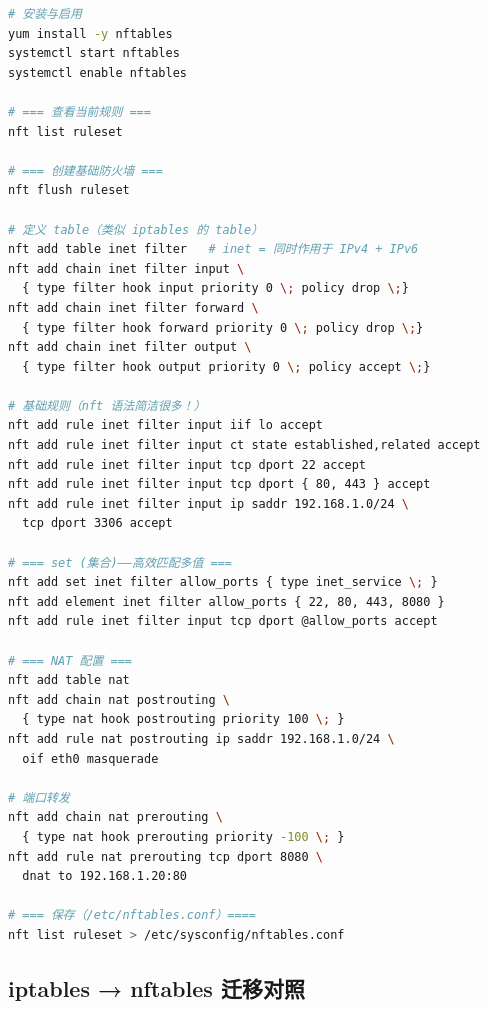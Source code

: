 \documentclass[12pt,UTF8]{ctexbook}
\begin{document}
\begin{lstlisting}[language=bash]
# 安装与启用
yum install -y nftables
systemctl start nftables
systemctl enable nftables

# === 查看当前规则 ===
nft list ruleset

# === 创建基础防火墙 ===
nft flush ruleset

# 定义 table（类似 iptables 的 table）
nft add table inet filter   # inet = 同时作用于 IPv4 + IPv6
nft add chain inet filter input \
  { type filter hook input priority 0 \; policy drop \;}
nft add chain inet filter forward \
  { type filter hook forward priority 0 \; policy drop \;}
nft add chain inet filter output \
  { type filter hook output priority 0 \; policy accept \;}

# 基础规则（nft 语法简洁很多！）
nft add rule inet filter input iif lo accept
nft add rule inet filter input ct state established,related accept
nft add rule inet filter input tcp dport 22 accept
nft add rule inet filter input tcp dport { 80, 443 } accept
nft add rule inet filter input ip saddr 192.168.1.0/24 \
  tcp dport 3306 accept

# === set (集合)——高效匹配多值 ===
nft add set inet filter allow_ports { type inet_service \; }
nft add element inet filter allow_ports { 22, 80, 443, 8080 }
nft add rule inet filter input tcp dport @allow_ports accept

# === NAT 配置 ===
nft add table nat
nft add chain nat postrouting \
  { type nat hook postrouting priority 100 \; }
nft add rule nat postrouting ip saddr 192.168.1.0/24 \
  oif eth0 masquerade

# 端口转发
nft add chain nat prerouting \
  { type nat hook prerouting priority -100 \; }
nft add rule nat prerouting tcp dport 8080 \
  dnat to 192.168.1.20:80

# === 保存（/etc/nftables.conf）====
nft list ruleset > /etc/sysconfig/nftables.conf
\end{lstlisting}

\subsection{iptables → nftables 迁移对照}
\end{document}
